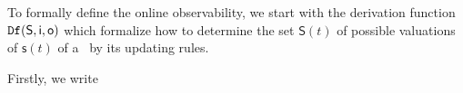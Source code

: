 






To formally define the online observability, we start with the derivation function ${\tt Df}( \mathsf{S},  \mathsf{i},  \mathsf{o})$ which formalize how to determine the set $\mathsf{S}(t)$ of possible valuations of $\mathsf{s}(t)$ of a \BCN\ by its updating rules.  %

Firstly, we write 

